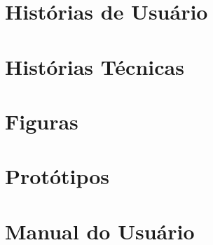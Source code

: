 \begin{apendicesenv}
    \partapendices

    \chapter{Histórias de Usuário}
    \label{ch:historias_de_usuario}
    

    \chapter{Histórias Técnicas}
    \label{ch:historias_tecnicas}
    

    \chapter{Figuras}
    \label{ch:figuras}
    

    \chapter{Protótipos}
    \label{ch:prototipos}
    

    \chapter{Manual do Usuário}
    \label{ch:manual}
    
    
\end{apendicesenv}